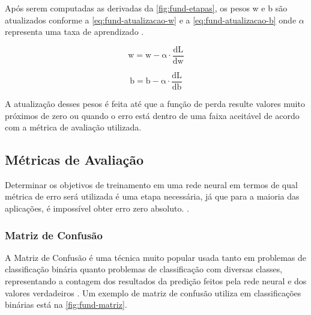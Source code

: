 Após serem computadas as derivadas da \autoref{fig:fund-etapas}, os pesos w e b são atualizados conforme a \autoref{eq:fund-atualizacao-w} e a \autoref{eq:fund-atualizacao-b} onde $\alpha$ representa uma taxa de aprendizado \cite{ref:Ng}.

\begin{equation} \label{eq:fund-atualizacao-w}
  \mathrm{
    w = w - \alpha \cdot \frac{dL}{dw}
  }
\end{equation}

\begin{equation} \label{eq:fund-atualizacao-b}
  \mathrm{
    b = b - \alpha \cdot \frac{dL}{db}
  }
\end{equation}

A atualização desses pesos é feita até que a função de perda resulte valores muito próximos de zero ou quando o erro está dentro de uma faixa aceitável de acordo com a métrica de avaliação utilizada.



\subsection{Métricas de Avaliação} \label{cap:fund-ia-metricas}
Determinar os objetivos de treinamento em uma rede neural em termos de qual métrica de erro será utilizada é uma etapa necessária, já que para a maioria das aplicações, é impossível obter erro zero absoluto. \cite{ref:Goodfellow-Bengio-Courville}.

\subsubsection{Matriz de Confusão} \label{cap:fund-ia-metricas-matriz}
A Matriz de Confusão é uma técnica muito popular usada tanto em problemas de classificação binária quanto problemas de classificação com diversas classes, representando a contagem dos resultados da predição feitos pela rede neural e dos valores verdadeiros \cite{ref:Batarseh-Yang}. Um exemplo de matriz de confusão utiliza em classificações binárias está na \autoref{fig:fund-matriz}.

